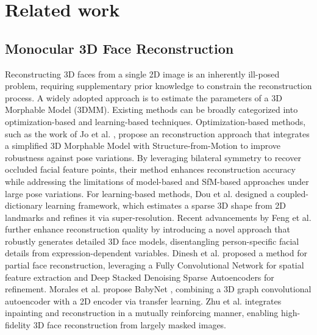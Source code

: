 \section{Related work}
\subsection{Monocular 3D Face Reconstruction} 
Reconstructing 3D faces from a single 2D image is an inherently ill-posed problem, requiring supplementary prior knowledge to constrain the reconstruction process. A widely adopted approach is to estimate the parameters of a 3D Morphable Model (3DMM). Existing methods can be broadly categorized into optimization-based and learning-based techniques. Optimization-based methods, such as the work of Jo et al. \cite{jo2015single}, propose an reconstruction approach that integrates a simplified 3D Morphable Model with Structure-from-Motion to improve robustness against pose variations. By leveraging bilateral symmetry to recover occluded facial feature points, their method enhances reconstruction accuracy while addressing the limitations of model-based and SfM-based approaches under large pose variations. For learning-based methods, Dou et al. \cite{dou2018monocular} designed a coupled-dictionary learning framework, which estimates a sparse 3D shape from 2D landmarks and refines it via super-resolution. Recent advancements by Feng et al. \cite{feng2021learning} further enhance reconstruction quality by introducing a novel approach that robustly generates detailed 3D face models, disentangling person-specific facial details from expression-dependent variables. Dinesh et al. \cite{dinesh2022fully} proposed a method for partial face reconstruction, leveraging a Fully Convolutional Network for spatial feature extraction and Deep Stacked Denoising Sparse Autoencoders for refinement. Morales et al. propose BabyNet \cite{morales2023babynet}, combining a 3D graph convolutional autoencoder with a 2D encoder via transfer learning. Zhu et al. \cite{zhu2025driving} integrates inpainting and reconstruction in a mutually reinforcing manner, enabling high-fidelity 3D face reconstruction from largely masked images.

